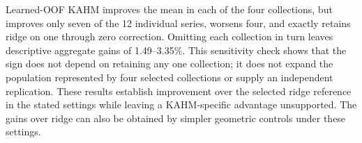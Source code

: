 Learned-OOF KAHM improves the mean in each of the four collections,
but improves only seven of the 12 individual series, worsens four,
and exactly retains ridge on one through zero correction. Omitting
each collection in turn leaves descriptive aggregate gains of
1.49--3.35\%. This sensitivity check shows that the sign does not
depend on retaining any one collection; it does not expand the
population represented by four selected collections or supply an
independent replication. These results establish improvement
over the selected ridge reference in the stated settings while
leaving a KAHM-specific advantage unsupported. The gains over ridge can also be obtained by simpler geometric
controls under these settings.



\FloatBarrier
